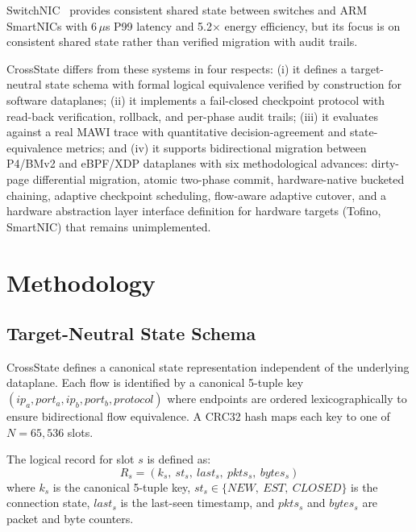 \documentclass[10pt, conference, compsoc]{IEEEtran}
\begin{document}
SwitchNIC~\cite{lei2025switchnic} provides consistent shared state between
switches and ARM SmartNICs with 6\,$\mu$s P99 latency and 5.2$\times$ energy
efficiency, but its focus is on consistent shared state rather than verified
migration with audit trails.

CrossState differs from these systems in four respects: (i) it defines a
target-neutral state schema with formal logical equivalence verified by
construction for software dataplanes; (ii) it implements a fail-closed
checkpoint protocol with read-back verification, rollback, and per-phase audit
trails; (iii) it evaluates against a real MAWI trace with quantitative
decision-agreement and state-equivalence metrics; and (iv) it supports
bidirectional migration between P4/BMv2 and eBPF/XDP dataplanes with six
methodological advances: dirty-page differential migration, atomic two-phase
commit, hardware-native bucketed chaining, adaptive checkpoint scheduling,
flow-aware adaptive cutover, and a hardware abstraction layer interface
definition for hardware targets (Tofino, SmartNIC) that remains unimplemented.

\section{Methodology}
\label{sec:methodology}

\subsection{Target-Neutral State Schema}
CrossState defines a canonical state representation independent of the
underlying dataplane. Each flow is identified by a canonical 5-tuple key
$(ip_a, port_a, ip_b, port_b, protocol)$ where endpoints are ordered
lexicographically to ensure bidirectional flow equivalence. A CRC32 hash maps
each key to one of $N = 65{,}536$ slots.

The logical record for slot $s$ is defined as:
\begin{equation}
    R_s = (k_s,\ st_s,\ last_s,\ pkts_s,\ bytes_s)
\label{eq:record}
\end{equation}
where $k_s$ is the canonical 5-tuple key, $st_s \in \{NEW,\ EST,\ CLOSED\}$ is
the connection state, $last_s$ is the last-seen timestamp, and $pkts_s$ and
$bytes_s$ are packet and byte counters.
\end{document}
